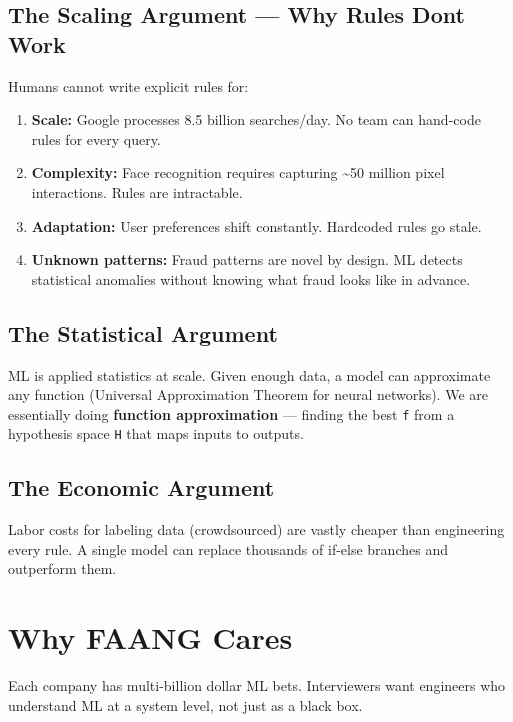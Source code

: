 \documentclass[11pt]{article}
\providecommand{\tightlist}{\setlength{\itemsep}{1pt}\setlength{\parskip}{0pt}}
\begin{document}
\subsection{The Scaling Argument --- Why Rules Don\textquotesingle t Work}\label{the-scaling-argument--why-rules-dont-work}

Humans cannot write explicit rules for:

\begin{enumerate}
\def\labelenumi{\arabic{enumi}.}
\tightlist
\item
  \textbf{Scale:} Google processes 8.5 billion searches/day. No team can hand-code rules for every query.
\item
  \textbf{Complexity:} Face recognition requires capturing \textasciitilde50 million pixel interactions. Rules are intractable.
\item
  \textbf{Adaptation:} User preferences shift constantly. Hardcoded rules go stale.
\item
  \textbf{Unknown patterns:} Fraud patterns are novel by design. ML detects statistical anomalies without knowing what fraud looks like in advance.
\end{enumerate}

\subsection{The Statistical Argument}\label{the-statistical-argument}

ML is applied statistics at scale. Given enough data, a model can approximate any function (Universal Approximation Theorem for neural networks). We are essentially doing \textbf{function approximation} --- finding the best \texttt{f} from a hypothesis space \texttt{H} that maps inputs to outputs.

\subsection{The Economic Argument}\label{the-economic-argument}

Labor costs for labeling data (crowdsourced) are vastly cheaper than engineering every rule. A single model can replace thousands of if-else branches and outperform them.

\section{Why FAANG Cares}\label{why-faang-cares}

Each company has multi-billion dollar ML bets. Interviewers want engineers who understand ML at a system level, not just as a black box.
\end{document}

